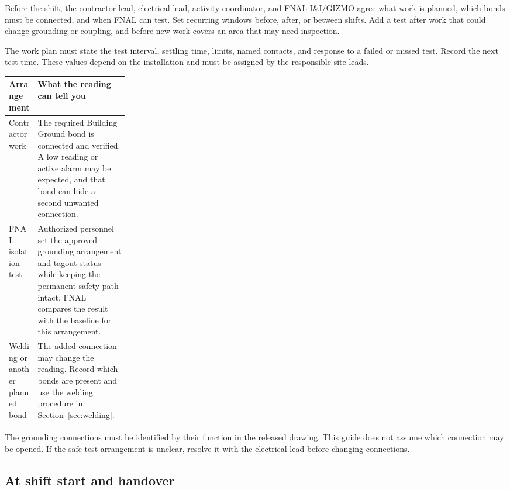 \documentclass[11pt]{article}
\begin{document}
Before the shift, the contractor lead, electrical lead, activity coordinator, and FNAL I\&I/GIZMO agree what work is planned, which bonds must be connected, and when FNAL can test. Set recurring windows before, after, or between shifts. Add a test after work that could change grounding or coupling, and before new work covers an area that may need inspection.

The work plan must state the test interval, settling time, limits, named contacts, and response to a failed or missed test. Record the next test time. These values depend on the installation and must be assigned by the responsible site leads.

\begin{tabularx}{\linewidth}{@{}L{0.24\linewidth}Y@{}}
\toprule
Arrangement & What the reading can tell you \\
\midrule
Contractor work & The required Building Ground bond is connected and verified. A low reading or active alarm may be expected, and that bond can hide a second unwanted connection. \\
FNAL isolation test & Authorized personnel set the approved grounding arrangement and tagout status while keeping the permanent safety path intact. FNAL compares the result with the baseline for this arrangement. \\
Welding or another planned bond & The added connection may change the reading. Record which bonds are present and use the welding procedure in Section~\ref{sec:welding}. \\
\bottomrule
\end{tabularx}

The grounding connections must be identified by their function in the released drawing. This guide does not assume which connection may be opened. If the safe test arrangement is unclear, resolve it with the electrical lead before changing connections.

\subsection{At shift start and handover}
\end{document}
